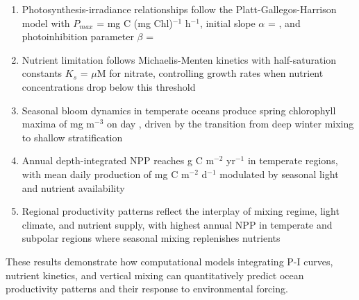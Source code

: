 \documentclass[a4paper, 11pt]{article}
\begin{document}
\begin{enumerate}
\item Photosynthesis-irradiance relationships follow the Platt-Gallegos-Harrison model with
$P_{max}$ =  mg C (mg Chl)$^{-1}$ h$^{-1}$, initial slope $\alpha$ =
, and photoinhibition parameter $\beta$ = 

\item Nutrient limitation follows Michaelis-Menten kinetics with half-saturation constants
$K_s$ =  $\mu$M for nitrate, controlling growth rates when nutrient
concentrations drop below this threshold

\item Seasonal bloom dynamics in temperate oceans produce spring chlorophyll maxima of
 mg m$^{-3}$ on day , driven
by the transition from deep winter mixing to shallow stratification

\item Annual depth-integrated NPP reaches  g C m$^{-2}$ yr$^{-1}$ in
temperate regions, with mean daily production of  mg C
m$^{-2}$ d$^{-1}$ modulated by seasonal light and nutrient availability

\item Regional productivity patterns reflect the interplay of mixing regime, light climate,
and nutrient supply, with highest annual NPP in temperate and subpolar regions where seasonal
mixing replenishes nutrients
\end{enumerate}

These results demonstrate how computational models integrating P-I curves, nutrient kinetics,
and vertical mixing can quantitatively predict ocean productivity patterns and their response
to environmental forcing.
\end{document}
